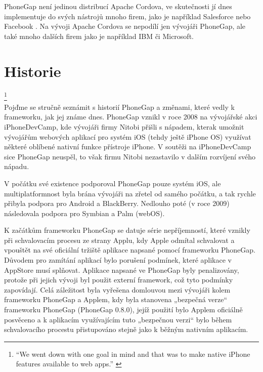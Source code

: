 PhoneGap není jedinou distribucí Apache Cordova, ve skutečnosti jí dnes implementuje do svých nástrojů mnoho firem, jako je například Salesforce nebo Facebook \cite{cordova_name}. Na vývoji Apache Cordova se nepodílí jen vývojáři PhoneGap, ale také mnoho dalších firem jako je například IBM či Microsoft.

\section{Historie}
\textit{ \cite{phonegap_announcement}}
\footnote{“We went down with one goal in mind and that was to make native iPhone features available to web apps.” \cite{phonegap_announcement}} \\

Pojďme se stručně seznámit s historií PhoneGap a změnami, které vedly k frameworku, jak jej známe dnes. PhoneGap vznikl v roce 2008 na vývojářské akci iPhoneDevCamp, kde vývojáři firmy Nitobi přišli s nápadem, kterak umožnit vývojářům webových aplikací pro systém iOS (tehdy ještě iPhone OS) využívat některé oblíbené nativní funkce přístroje iPhone. V soutěži na iPhoneDevCamp sice PhoneGap neuspěl, to však firmu Nitobi nezastavilo v dalším rozvíjení svého nápadu.

V počátku své existence podporoval PhoneGap pouze systém iOS, ale multiplatformnost byla brána vývojáři na zřetel od samého počátku, a tak rychle přibyla podpora pro Android a BlackBerry. Nedlouho poté (v roce 2009) následovala podpora pro Symbian a Palm (webOS).

K začátkům frameworku PhoneGap se datuje série nepříjemností, které vznikly při schvalovacím procesu ze strany Applu, kdy Apple odmítal schvalovat a vpouštět na své oficiální tržiště aplikace napsané pomocí frameworku PhoneGap. Důvodem pro zamítání aplikací bylo porušení podmínek, které aplikace v AppStore musí splňovat. Aplikace napsané ve PhoneGap byly penalizovány, protože při jejich vývoji byl použit externí framework, což tyto podmínky zapovídají. Celá záležitost byla vyřešena domlouvou mezi vývojáři kolem frameworku PhoneGap a Applem, kdy byla stanovena „bezpečná verze“ frameworku PhoneGap (PhoneGap 0.8.0), jejíž použití bylo Applem oficiálně posvěceno a k aplikacím využívajícím tuto „bezpečnou verzi“ bylo během schvalovacího procestu přistupováno stejně jako k běžným nativním aplikacím. \cite{open_letter_to_apple,updates_on_apple,phonegap_permitted_appstore,phonegap_store_approval}

